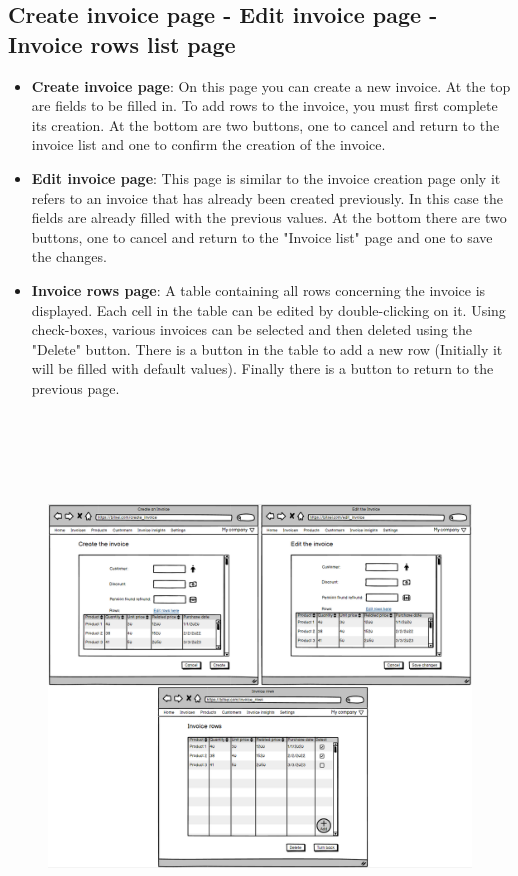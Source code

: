 \subsection{Create invoice page - Edit invoice page - Invoice rows list page}

\begin{itemize}
    \item \textbf{Create invoice page}: On this page you can create a new invoice. At the top are fields to be filled in. To add rows to the invoice, you must first complete its creation. At the bottom are two buttons, one to cancel and return to the invoice list and one to confirm the creation of the invoice.
    \item \textbf{Edit invoice page}: This page is similar to the invoice creation page only it refers to an invoice that has already been created previously. In this case the fields are already filled with the previous values. At the bottom there are two buttons, one to cancel and return to the "Invoice list" page and one to save the changes.
    \item \textbf{Invoice rows page}: A table containing all rows concerning the invoice is displayed. Each cell in the table can be edited by double-clicking on it. Using check-boxes, various invoices can be selected and then deleted using the "Delete" button. There is a button in the table to add a new row (Initially it will be filled with default values). Finally there is a button to return to the previous page.
\end{itemize}

\begin{figure}[h!]
    \centering
    \includegraphics[height=410pt, keepaspectratio]{resources/mockup/Invoice.png}
\end{figure}
\newpage

